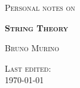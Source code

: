\begin{titlepage}
    \begin{center}
        \vspace*{2cm}
        
        \Large
        \textsc{Personal notes on}
        
        
        \vspace{1cm}
        \Huge
        \textsc{ \textbf{String Theory}}
        
        \vspace{1cm}
        \Large
        \textsc{ Bruno Murino}
        
        \vfill
        
        \textsc{ Last edited:}\\
        \textsc{ \today}
        
    \end{center}
\end{titlepage}